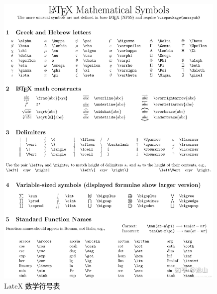 \documentclass{article}
\begin{document}
\begin{figure}[H]
    \centering
    \includegraphics[width=0.99\textwidth]{img/latex-math-example.jpg}
    \caption{LateX 数学符号表}
    \label{fig:latex-math-symbols}
\end{figure}
\end{document}
